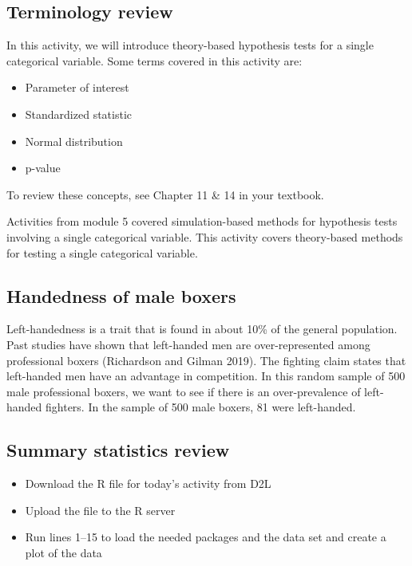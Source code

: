 \documentclass[
]{report}
\begin{document}
\subsection{Terminology review}\label{terminology-review-7}

In this activity, we will introduce theory-based hypothesis tests for a single categorical variable. Some terms covered in this activity are:

\begin{itemize}
\item
  Parameter of interest
\item
  Standardized statistic
\item
  Normal distribution
\item
  p-value
\end{itemize}

To review these concepts, see Chapter 11 \& 14 in your textbook.

Activities from module 5 covered simulation-based methods for hypothesis tests involving a single categorical variable. This activity covers theory-based methods for testing a single categorical variable.

\subsection{Handedness of male boxers}\label{handedness-of-male-boxers}

Left-handedness is a trait that is found in about 10\% of the general population. Past studies have shown that left-handed men are over-represented among professional boxers (Richardson and Gilman 2019). The fighting claim states that left-handed men have an advantage in competition. In this random sample of 500 male professional boxers, we want to see if there is an over-prevalence of left-handed fighters. In the sample of 500 male boxers, 81 were left-handed.

\subsection{Summary statistics review}\label{summary-statistics-review}

\begin{itemize}
\item
  Download the R file for today's activity from D2L
\item
  Upload the file to the R server
\item
  Run lines 1--15 to load the needed packages and the data set and create a plot of the data
\end{itemize}
\end{document}
